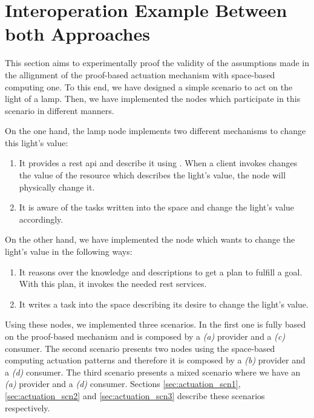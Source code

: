 \section{Interoperation Example Between both Approaches}

This section aims to experimentally proof the validity of the assumptions made in the allignment of the proof-based actuation mechanism with space-based computing one.
To this end, we have designed a simple scenario to act on the light of a lamp.
Then, we have implemented the nodes which participate in this scenario in different manners.


On the one hand, the lamp node implements two different mechanisms to change this light's value:
\begin{enumerate}[label=\itshape(\alph*\upshape)]
  \item It provides a \ac{rest} \ac{api} and describe it using \restdesc{}. %
        When a client invokes changes the value of the resource which describes the light's value, the node will physically change it.
  \item It is aware of the tasks written into the space and change the light's value accordingly. %
\end{enumerate}


On the other hand, we have implemented the node which wants to change the light's value in the following ways:
\begin{enumerate}[resume,label=\itshape(\alph*\upshape)]
  \item It reasons over the knowledge and descriptions to get a plan to fulfill a goal.
	With this plan, it invokes the needed \ac{rest} services.
  \item It writes a task into the space describing its desire to change the light's value.
\end{enumerate}


Using these nodes, we implemented three scenarios.
In the first one is fully based on the proof-based mechanism and is composed by a \emph{(a)} provider and a \emph{(c)} consumer.
The second scenario presents two nodes using the space-based computing actuation patterns and therefore it is composed by a \emph{(b)} provider and a \emph{(d)} consumer.
The third scenario presents a mixed scenario where we have an \emph{(a)} provider and a \emph{(d)} consumer.
Sections \ref{sec:actuation_scn1}, \ref{sec:actuation_scn2} and \ref{sec:actuation_scn3} describe these scenarios respectively.


